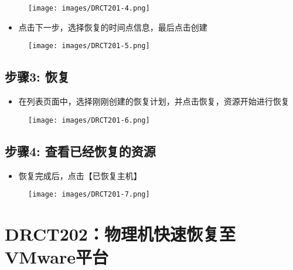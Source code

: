 \begin{figure}[htbp]
\centering
\texttt{[image: images/DRCT201-4.png]}
\end{figure}

\begin{itemize}
\item 点击下一步，选择恢复的时间点信息，最后点击创建

\end{itemize}

\begin{figure}[htbp]
\centering
\texttt{[image: images/DRCT201-5.png]}
\end{figure}

\subsection{步骤3: 恢复}
\label{步骤3:恢复}

\begin{itemize}
\item 在列表页面中，选择刚刚创建的恢复计划，并点击恢复，资源开始进行恢复

\end{itemize}

\begin{figure}[htbp]
\centering
\texttt{[image: images/DRCT201-6.png]}
\end{figure}

\subsection{步骤4: 查看已经恢复的资源}
\label{步骤4:查看已经恢复的资源}

\begin{itemize}
\item 恢复完成后，点击【已恢复主机】

\end{itemize}

\begin{figure}[htbp]
\centering
\texttt{[image: images/DRCT201-7.png]}
\end{figure}

\section{DRCT202：物理机快速恢复至VMware平台}
\label{drct202：物理机快速恢复至vmware平台}

